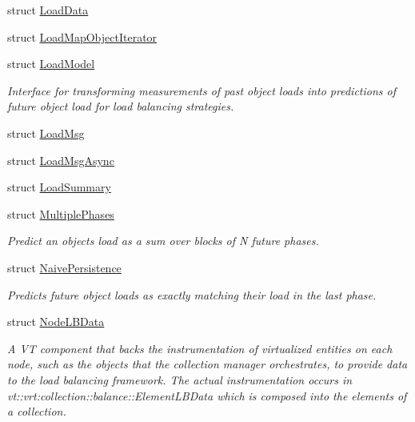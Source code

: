 \begin{DoxyCompactItemize}
struct \hyperlink{structvt_1_1vrt_1_1collection_1_1balance_1_1_load_data}{Load\+Data}
\item 
struct \hyperlink{structvt_1_1vrt_1_1collection_1_1balance_1_1_load_map_object_iterator}{Load\+Map\+Object\+Iterator}
\item 
struct \hyperlink{structvt_1_1vrt_1_1collection_1_1balance_1_1_load_model}{Load\+Model}
\begin{DoxyCompactList}\small\item\em Interface for transforming measurements of past object loads into predictions of future object load for load balancing strategies. \end{DoxyCompactList}\item 
struct \hyperlink{structvt_1_1vrt_1_1collection_1_1balance_1_1_load_msg}{Load\+Msg}
\item 
struct \hyperlink{structvt_1_1vrt_1_1collection_1_1balance_1_1_load_msg_async}{Load\+Msg\+Async}
\item 
struct \hyperlink{structvt_1_1vrt_1_1collection_1_1balance_1_1_load_summary}{Load\+Summary}
\item 
struct \hyperlink{structvt_1_1vrt_1_1collection_1_1balance_1_1_multiple_phases}{Multiple\+Phases}
\begin{DoxyCompactList}\small\item\em Predict an object\textquotesingle{}s load as a sum over blocks of N future phases. \end{DoxyCompactList}\item 
struct \hyperlink{structvt_1_1vrt_1_1collection_1_1balance_1_1_naive_persistence}{Naive\+Persistence}
\begin{DoxyCompactList}\small\item\em Predicts future object loads as exactly matching their load in the last phase. \end{DoxyCompactList}\item 
struct \hyperlink{structvt_1_1vrt_1_1collection_1_1balance_1_1_node_l_b_data}{Node\+L\+B\+Data}
\begin{DoxyCompactList}\small\item\em A VT component that backs the instrumentation of virtualized entities on each node, such as the objects that the collection manager orchestrates, to provide data to the load balancing framework. The actual instrumentation occurs in {\ttfamily vt\+::vrt\+:collection\+:}\+:balance\+::\+Element\+L\+B\+Data which is composed into the elements of a collection. \end{DoxyCompactList}\item 

\end{DoxyCompactItemize}
